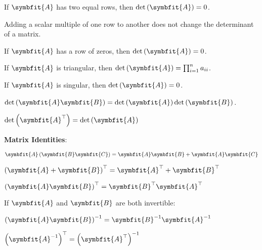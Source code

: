 \documentclass{article}
\begin{document}
\indent If $\symbfit{A}$ has two equal rows, then 
$\det{\left( \symbfit{A} \right)}=0$. 

\indent Adding a scalar multiple of one row to another does not change 
the determinant of a matrix. 

\indent If $\symbfit{A}$ has a row of zeros, then 
$\det{\left( \symbfit{A} \right)}=0$. 

\indent If $\symbfit{A}$ is triangular, then 
$\det{\left( \symbfit{A} \right)}=\prod_{i=1}^{n} a_{ii}$. 

\indent If $\symbfit{A}$ is singular, then 
$\det{\left( \symbfit{A} \right)}=0$. 

\indent$\det{\left( \symbfit{A}\symbfit{B} \right)} = \det{\left( \symbfit{A} \right)}\det{\left( \symbfit{B} \right)}$. 

\indent$\det{\left( \symbfit{A}^\top \right)} = \det{\left( \symbfit{A} \right)}$ 

\noindent\textbf{Matrix Identities}:

\indent$\symbfit{A}\left( \symbfit{B}\symbfit{C} \right) = \symbfit{A}\symbfit{B}+\symbfit{A}\symbfit{C}$

\indent$\left( \symbfit{A}+\symbfit{B} \right)^\top = \symbfit{A}^\top + \symbfit{B}^\top$

\indent$\left( \symbfit{A}\symbfit{B} \right)^\top = \symbfit{B}^\top \symbfit{A}^\top$

\indent If $\symbfit{A}$ and $\symbfit{B}$ are both invertible:

\indent$\left( \symbfit{A}\symbfit{B} \right)^{-1} = \symbfit{B}^{-1}\symbfit{A}^{-1}$

\indent$\left( \symbfit{A}^{-1} \right)^\top = \left( \symbfit{A}^\top \right)^{-1}$
\end{document}
